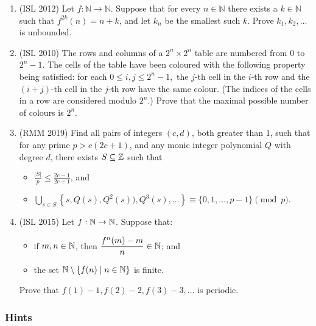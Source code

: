 \documentclass[11pt,paper=letter]{scrartcl}
\begin{document}
\begin{enumerate}[resume]
\item (ISL 2012) Let $f: \mathbb{N} \rightarrow \mathbb{N}$. Suppose that for every $n \in \mathbb{N}$ there exists a $k \in \mathbb{N}$ such that $f^{2k}(n) = n + k$, and let $k_n$ be the smallest such $k$. Prove $k_1, k_2, \ldots$ is unbounded.
\hints{\ref{h:14} \ref{h:15} \ref{h:16}}

\item (ISL 2010) The rows and columns of a $2^n \times 2^n$ table are numbered from $0$ to $2^{n}-1.$ The cells of the table have been coloured with the following property being satisfied: for each $0 \leq i,j \leq 2^n - 1,$ the $j$-th cell in the $i$-th row and the $(i+j)$-th cell in the $j$-th row have the same colour. (The indices of the cells in a row are considered modulo $2^n$.) Prove that the maximal possible number of colours is $2^n$.
\hints{\ref{h:19} \ref{h:20} \ref{h:21}}

\item (RMM 2019) Find all pairs of integers $(c, d)$, both greater than 1, such that for any prime $p > c(2c + 1)$, and any monic integer polynomial $Q$ with degree $d$, there exists $S \subseteq \mathbb Z$ such that
\begin{itemize}
\item $\displaystyle \frac{|S|}{p} \le \frac{2c-1}{2c+1}$, and
\item $\displaystyle \bigcup_{s \in S} \left\{s, Q(s), Q^2(s)), Q^3(s), \dots\right\} \equiv \{0, 1, \ldots, p -1\} \pmod{p}$.
\hints{\ref{h:24} \ref{h:25} \ref{h:26}}
\end{itemize}

\item (ISL 2015) Let $f: \mathbb N \to \mathbb N$. Suppose that:
\begin{itemize}
\item if $m, n \in \mathbb N$, then $\dfrac{f^n(m) - m}{n} \in \mathbb N$; and
\item the set $\mathbb N \setminus \{f(n) \mid n\in \mathbb N\}$ is finite.
\end{itemize}
Prove that $f(1) - 1, f(2) - 2, f(3) - 3, \ldots$ is periodic.
\hints{\ref{h:3} \ref{h:22} \ref{h:23}}
\end{enumerate}

\subsubsection*{Hints}
\end{document}
